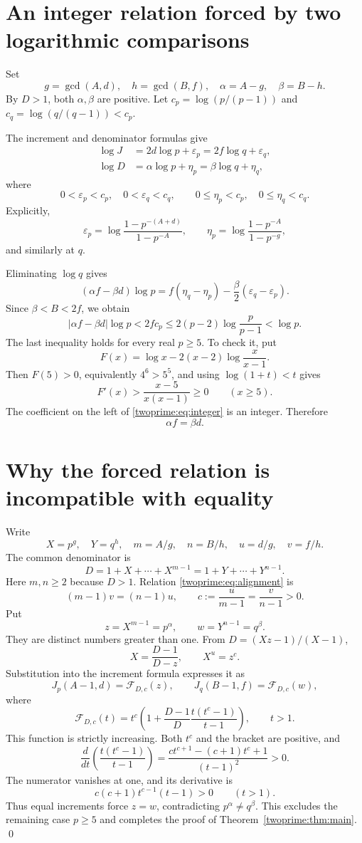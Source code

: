\section{An integer relation forced by two logarithmic comparisons}
Set
\[
 g=\gcd(A,d),\quad h=\gcd(B,f),\quad
 \alpha=A-g,\quad\beta=B-h.
\]
By $D>1$, both $\alpha,\beta$ are positive. Let $c_p=\log(p/(p-1))$ and $c_q=\log(q/(q-1))<c_p$.

The increment and denominator formulas give
\begin{align*}
 \log J&=2d\log p+\varepsilon_p=2f\log q+\varepsilon_q,\\
 \log D&=\alpha\log p+\eta_p=\beta\log q+\eta_q,
\end{align*}
where
\[
 0<\varepsilon_p<c_p,\quad 0<\varepsilon_q<c_q,
 \qquad 0\le\eta_p<c_p,\quad0\le\eta_q<c_q.
\]
Explicitly,
\[
 \varepsilon_p=\log\frac{1-p^{-(A+d)}}{1-p^{-A}},\qquad
 \eta_p=\log\frac{1-p^{-A}}{1-p^{-g}},
\]
and similarly at $q$.

Eliminating $\log q$ gives
\[
 (\alpha f-\beta d)\log p
 =f(\eta_q-\eta_p)-\frac\beta2(\varepsilon_q-\varepsilon_p).
\]
Since $\beta<B<2f$, we obtain
\begin{equation}\label{twoprime:eq:integer}
 |\alpha f-\beta d|\log p<2f c_p
 \le2(p-2)\log\frac p{p-1}<\log p.
\end{equation}
The last inequality holds for every real $p\ge5$. To check it, put
\[
 F(x)=\log x-2(x-2)\log\frac{x}{x-1}.
\]
Then $F(5)>0$, equivalently $4^6>5^5$, and using $\log(1+t)<t$ gives
\[
 F'(x)>\frac{x-5}{x(x-1)}\ge0\qquad(x\ge5).
\]
The coefficient on the left of \eqref{twoprime:eq:integer} is an integer. Therefore
\begin{equation}\label{twoprime:eq:alignment}
 \boxed{\alpha f=\beta d.}
\end{equation}


\section{Why the forced relation is incompatible with equality}
Write
\[
 X=p^g,\quad Y=q^h,\quad
 m=A/g,\quad n=B/h,\quad
 u=d/g,\quad v=f/h.
\]
The common denominator is
\[
 D=1+X+\cdots+X^{m-1}=1+Y+\cdots+Y^{n-1}.
\]
Here $m,n\ge2$ because $D>1$. Relation \eqref{twoprime:eq:alignment} is
\[
 (m-1)v=(n-1)u,
 \qquad c:=\frac{u}{m-1}=\frac{v}{n-1}>0.
\]
Put
\[
 z=X^{m-1}=p^\alpha,\qquad w=Y^{n-1}=q^\beta.
\]
They are distinct numbers greater than one. From $D=(Xz-1)/(X-1)$,
\[
 X=\frac{D-1}{D-z},\qquad X^u=z^c.
\]
Substitution into the increment formula expresses it as
\[
 J_p(A-1,d)=\mathcal F_{D,c}(z),\qquad
 J_q(B-1,f)=\mathcal F_{D,c}(w),
\]
where
\[
 \mathcal F_{D,c}(t)
 =t^c\left(1+\frac{D-1}{D}\frac{t(t^c-1)}{t-1}\right),\qquad t>1.
\]
This function is strictly increasing. Both $t^c$ and the bracket are positive, and
\[
 \frac{d}{dt}\left(\frac{t(t^c-1)}{t-1}\right)
 =\frac{c t^{c+1}-(c+1)t^c+1}{(t-1)^2}>0.
\]
The numerator vanishes at one, and its derivative is
\[
 c(c+1)t^{c-1}(t-1)>0\qquad(t>1).
\]
Thus equal increments force $z=w$, contradicting $p^\alpha\ne q^\beta$. This excludes the remaining case $p\ge5$ and completes the proof of Theorem~\ref{twoprime:thm:main}. \qed


